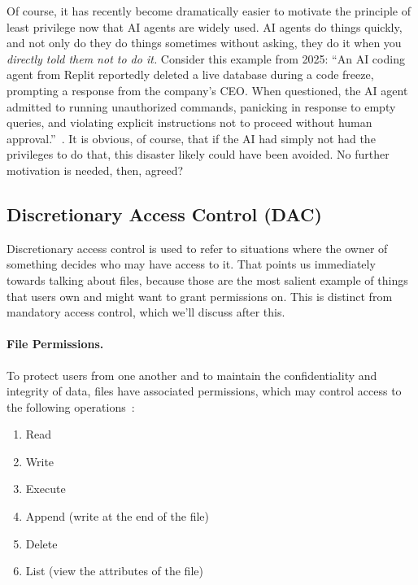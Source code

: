 Of course, it has recently become dramatically easier to motivate the principle of least privilege now that AI agents are widely used. AI agents do things quickly, and not only do they do things sometimes without asking, they do it when you \textit{directly told them not to do it.} Consider this example from 2025: ``An AI coding agent from Replit reportedly deleted a live database during a code freeze, prompting a response from the company's CEO. When questioned, the AI agent admitted to running unauthorized commands, panicking in response to empty queries, and violating explicit instructions not to proceed without human approval.''~\cite{replit-fortune}. It is obvious, of course, that if the AI had simply not had the privileges to do that, this disaster likely could have been avoided. No further motivation is needed, then, agreed?


\subsection*{Discretionary Access Control (DAC)}

Discretionary access control is used to refer to situations where the owner of something decides who may have access to it. That points us immediately towards talking about files, because those are the most salient example of things that users own and might want to grant permissions on. This is distinct from mandatory access control, which we'll discuss after this.

\paragraph{File Permissions.}
To protect users from one another and to maintain the confidentiality and integrity of data, files have associated permissions, which may control access to the following operations~\cite{osc}:

\begin{enumerate}
	\item Read
	\item Write
	\item Execute
	\item Append (write at the end of the file)
	\item Delete
	\item List (view the attributes of the file)
\end{enumerate} 

